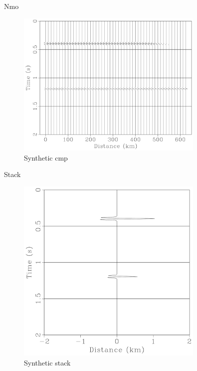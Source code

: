 \documentclass[xcolor=dvipsnames,notes]{beamer}
\begin{document}
\begin{frame}{Nmo}
\begin{figure}
  \includegraphics[width=0.8\textwidth]{Fig/syncmp.pdf}
  \caption{Synthetic cmp}
  \label{fig:syncmp}
\end{figure}
\end{frame}
\begin{frame}{Stack}
\begin{figure}
  \includegraphics[width=0.8\textwidth]{Fig/synstack.pdf}
  \caption{Synthetic stack}
  \label{fig:synstack}
\end{figure}
\end{frame}
\end{document}
